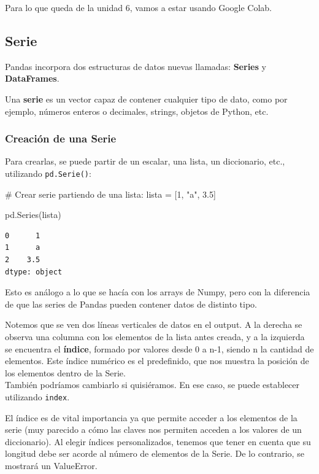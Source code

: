 \documentclass[
  letterpaper,
  DIV=11,
  numbers=noendperiod]{scrreprt}
\newenvironment{Shaded}{\begin{snugshade}}{\end{snugshade}}
\newcommand{\CommentTok}[1]{\textcolor[rgb]{0.37,0.37,0.37}{#1}}
\newcommand{\DecValTok}[1]{\textcolor[rgb]{0.68,0.00,0.00}{#1}}
\newcommand{\FloatTok}[1]{\textcolor[rgb]{0.68,0.00,0.00}{#1}}
\newcommand{\NormalTok}[1]{\textcolor[rgb]{0.00,0.23,0.31}{#1}}
\newcommand{\OperatorTok}[1]{\textcolor[rgb]{0.37,0.37,0.37}{#1}}
\newcommand{\StringTok}[1]{\textcolor[rgb]{0.13,0.47,0.30}{#1}}
\begin{document}
Para lo que queda de la unidad 6, vamos a estar usando Google Colab.

\subsection{Serie}\label{serie}

Pandas incorpora dos estructuras de datos nuevas llamadas:
\textbf{Series} y \textbf{DataFrames}.

Una \textbf{serie} es un vector capaz de contener cualquier tipo de
dato, como por ejemplo, números enteros o decimales, strings, objetos de
Python, etc.

\subsubsection{Creación de una Serie}\label{creaciuxf3n-de-una-serie}

Para crearlas, se puede partir de un escalar, una lista, un diccionario,
etc., utilizando \texttt{pd.Serie()}:

\begin{Shaded}
\begin{Highlighting}[]
\CommentTok{\# Crear serie partiendo de una lista:}
\NormalTok{lista }\OperatorTok{=}\NormalTok{ [}\DecValTok{1}\NormalTok{, }\StringTok{"a"}\NormalTok{, }\FloatTok{3.5}\NormalTok{]}

\NormalTok{pd.Series(lista)}
\end{Highlighting}
\end{Shaded}

\begin{verbatim}
0      1
1      a
2    3.5
dtype: object
\end{verbatim}

Esto es análogo a lo que se hacía con los arrays de Numpy, pero con la
diferencia de que las series de Pandas pueden contener datos de distinto
tipo.

Notemos que se ven dos líneas verticales de datos en el output. A la
derecha se observa una columna con los elementos de la lista antes
creada, y a la izquierda se encuentra el \textbf{índice}, formado por
valores desde 0 a n-1, siendo n la cantidad de elementos. Este índice
numérico es el predefinido, que nos muestra la posición de los elementos
dentro de la Serie.\\
También podríamos cambiarlo si quisiéramos. En ese caso, se puede
establecer utilizando \texttt{index}.

El índice es de vital importancia ya que permite acceder a los elementos
de la serie (muy parecido a cómo las claves nos permiten acceden a los
valores de un diccionario). Al elegir índices personalizados, tenemos
que tener en cuenta que su longitud debe ser acorde al número de
elementos de la Serie. De lo contrario, se mostrará un ValueError.
\end{document}
